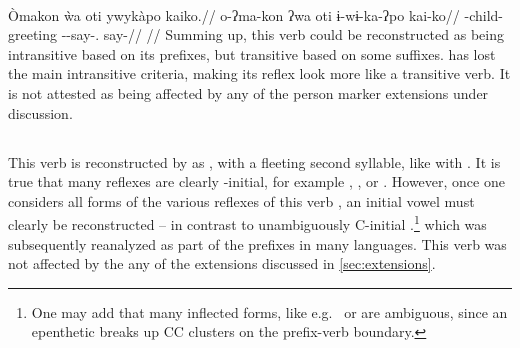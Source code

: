 \kalina \parencite[][202]{courtz2008carib}\\
\begingl
\glpreamble Òmakon \`wa oti ywykàpo kaiko.//
\gla o-ʔma-kon ʔwa oti ɨ-wɨ-ka-ʔpo kai-ko//
\glb {}-child-  greeting --say-. say-//
\glft {}//
\endgl
\xe
%
Summing up, this verb could be reconstructed as being intransitive based on its prefixes, but transitive based on some suffixes.
\hixka has lost the main intransitive criteria, making its reflex look more like a transitive verb.
It is not attested as being affected by any of the person marker extensions under discussion.

\subsection{ }
\label{sec:go}
This verb is reconstructed by \textcite{gildea2007greenberg} as , with a fleeting second syllable, like with  .
It is true that many reflexes are clearly -initial, for example \hixka {}  \parencite[27]{hixkaryanaderby1985}, \trio {}  \parencite[246]{triomeira1999}, or \wayana {}  \parencite[195]{wayanatavares2005}.
However, once one considers all forms of the various reflexes of this verb , an initial vowel  must clearly be reconstructed -- in contrast to unambiguously C-initial  .\footnote{One may add that many inflected forms, like e.g.\ \trio {} or \arara {}  \parencites[43]{triomeira1999}[153]{alves2017arara} are ambiguous, since an epenthetic  breaks up CC clusters on the prefix-verb boundary.} which was subsequently reanalyzed as part of the prefixes in many languages.
This verb was not affected by the any of the extensions discussed in \cref{sec:extensions}.


%

